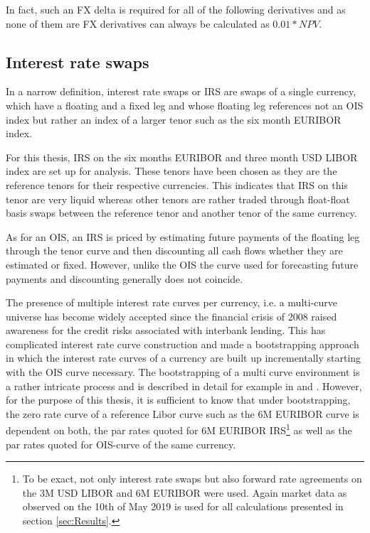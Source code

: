 \documentclass[../Thesis_AHoecherl.tex]{subfiles}
\begin{document}
    In fact, such an FX delta is required for all of the following derivatives and as none of them are FX derivatives can always be calculated as $0.01 * NPV$.

    \subsection{Interest rate swaps}

    In a narrow definition, interest rate swaps or \gls{IRS} are swaps of a single currency, which have a floating and a fixed leg and whose floating leg references not an OIS index but rather an index of a larger tenor such as the six month EURIBOR index.

    For this thesis, IRS on the six months EURIBOR and three month USD LIBOR index are set up for analysis.
    These tenors have been chosen as they are the reference tenors for their respective currencies. 
    This indicates that IRS on this tenor are very liquid whereas other tenors are rather traded through float-float basis swaps between the reference tenor and another tenor of the same currency.

    As for an OIS, an IRS is priced by estimating future payments of the floating leg through the tenor curve and then discounting all cash flows whether they are estimated or fixed.
    However, unlike the OIS the curve used for forecasting future payments and discounting generally does not coincide.

    The presence of multiple interest rate curves per currency, i.e. a multi-curve universe has become widely accepted since the financial crisis of 2008 raised awareness for the credit risks associated with interbank lending.
    This has complicated interest rate curve construction and made a bootstrapping approach in which the interest rate curves of a currency are built up incrementally starting with the OIS curve necessary.
    The bootstrapping of a multi curve environment is a rather intricate process and is described in detail for example in \cite{ametrano2013everything} and \cite{brugger2018valuation}.
    However, for the purpose of this thesis, it is sufficient to know that under bootstrapping, the zero rate curve of a reference Libor curve such as the 6M EURIBOR curve is dependent on both, the par rates quoted for 6M EURIBOR IRS\footnote{To be exact, not only interest rate swaps but also forward rate agreements on the 3M USD LIBOR and 6M EURIBOR were used. Again market data as observed on the 10th of May 2019 is used for all calculations presented in section \ref{sec:Results}.} as well as the par rates quoted for OIS-curve of the same currency.
\end{document}
